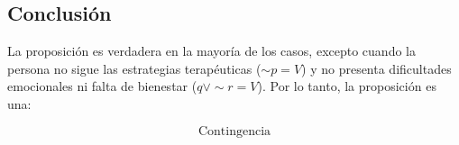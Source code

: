 \documentclass{article}
\begin{document}
	\subsection*{Conclusión}
	
	La proposición es verdadera en la mayoría de los casos, excepto cuando la persona no sigue las estrategias terapéuticas (\(\sim p = V\)) y no presenta dificultades emocionales ni falta de bienestar (\(q \lor \sim r = V\)).  
	Por lo tanto, la proposición es una:
	
	
	\[
	\boxed{\text{Contingencia}}
	\]
	
	
	
\end{document}
